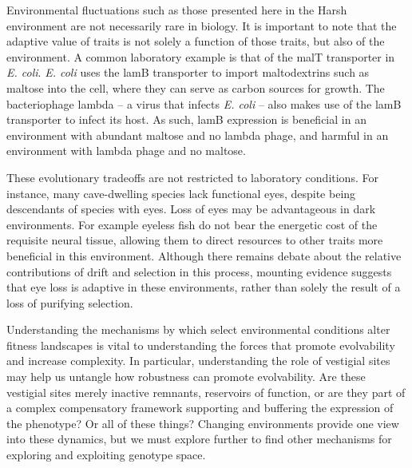 \documentclass[10pt,letterpaper,final]{article}
\begin{document}
Environmental fluctuations such as those presented here in the Harsh environment are not necessarily rare in biology.  It is important to note that the adaptive value of traits is not solely a function of those traits, but also of the environment.  A common laboratory example is that of the malT transporter in \textit{E. coli}.  \textit{E. coli} uses the lamB transporter to import maltodextrins such as maltose into the cell, where they can serve as carbon sources for growth.  The bacteriophage lambda – a virus that infects \textit{E. coli} – also makes use of the lamB transporter to infect its host\cite{boos_maltose/maltodextrin_1998,meyer_repeatability_2012-1}.  As such, lamB expression is beneficial in an environment with abundant maltose and no lambda phage, and harmful in an environment with lambda phage and no maltose.

These evolutionary tradeoffs are not restricted to laboratory conditions.  For instance, many cave-dwelling species lack functional eyes, despite being descendants of species with eyes\cite{krishnan_cavefish_2017}.  Loss of eyes may be advantageous in dark environments.  For example eyeless fish do not bear the energetic cost of the requisite neural tissue\cite{moran_energetic_2015}, allowing them to direct resources to other traits more beneficial in this environment.  Although there remains debate about the relative contributions of drift and selection in this process\cite{lahti_relaxed_2009,retaux_evolution_2013}, mounting evidence suggests that eye loss is adaptive in these environments, rather than solely the result of a loss of purifying selection\cite{retaux_evolution_2013,krishnan_cavefish_2017}.

Understanding the mechanisms by which select environmental conditions alter fitness landscapes is vital to understanding the forces that promote evolvability and increase complexity. In particular, understanding the role of vestigial sites may help us untangle how robustness can promote evolvability. Are these vestigial sites merely inactive remnants, reservoirs of function, or are they part of a complex compensatory framework supporting and buffering the expression of the phenotype? Or all of these things? Changing environments provide one view into these dynamics, but we must explore further to find other mechanisms for exploring and exploiting genotype space.
\end{document}
